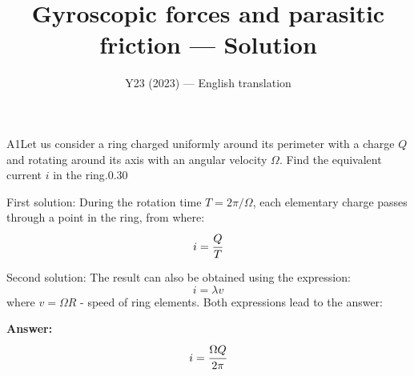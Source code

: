 \documentclass[11pt,a4paper]{article}
\title{\textbf{Gyroscopic forces and parasitic friction --- Solution}}
\author{\normalsize Y23 (2023) — English translation}
\date{}
\begin{document}
\maketitle\vspace{-0.5em}
\begin{solcard}{A1}{Let us consider a ring charged uniformly around its perimeter with a charge $Q$ and rotating around its axis with an angular velocity $\Omega$. Find the equivalent current $i$ in the ring.}{0.30}

First solution: During the rotation time $T=2\pi/\Omega$, each elementary charge passes through a point in the ring, from where: $$i=\cfrac{Q}{T} $$


Second solution: The result can also be obtained using the expression: $$i=\lambda v $$ where $v=\Omega R$ - speed of ring elements. Both expressions lead to the answer:

\par\smallskip\noindent\textbf{Answer:} $$i=\cfrac{\Omega Q}{2\pi} $$
\end{solcard}
\end{document}
